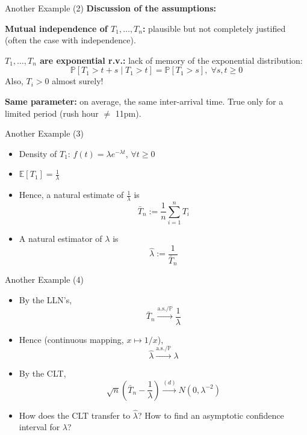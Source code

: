 \documentclass[aspectratio=169]{beamer}
\begin{document}
\begin{frame}{Another Example (2)}
\textbf{Discussion of the assumptions:}

\vspace{0.3cm}

\textbf{Mutual independence of $T_1, \ldots, T_n$:} plausible but not completely justified (often the case with independence).

\vspace{0.3cm}

\textbf{$T_1, \ldots, T_n$ are exponential r.v.:} lack of memory of the exponential distribution:
\[\mathbb{P}[T_1 > t + s \mid T_1 > t] = \mathbb{P}[T_1 > s], \; \forall s,t \geq 0\]
Also, $T_i > 0$ almost surely!

\vspace{0.3cm}

\textbf{Same parameter:} on average, the same inter-arrival time. True only for a limited period (rush hour $\neq$ 11pm).
\end{frame}

\begin{frame}{Another Example (3)}
\begin{itemize}
    \item Density of $T_1$: $f(t) = \lambda e^{-\lambda t}$, $\forall t \geq 0$

    \item $\mathbb{E}[T_1] = \frac{1}{\lambda}$

    \item Hence, a natural estimate of $\frac{1}{\lambda}$ is
    \[\bar{T}_n := \frac{1}{n}\sum_{i=1}^{n}T_i\]

    \item A natural estimator of $\lambda$ is
    \[\hat{\lambda} := \frac{1}{\bar{T}_n}\]
\end{itemize}
\end{frame}

\begin{frame}{Another Example (4)}
\begin{itemize}
    \item By the LLN's,
    \[\bar{T}_n \xrightarrow{\text{a.s.}/\mathbb{P}} \frac{1}{\lambda}\]

    \item Hence (continuous mapping, $x \mapsto 1/x$),
    \[\hat{\lambda} \xrightarrow{\text{a.s.}/\mathbb{P}} \lambda\]

    \item By the CLT,
    \[\sqrt{n}\left(\bar{T}_n - \frac{1}{\lambda}\right) \xrightarrow{(d)} N(0, \lambda^{-2})\]

    \item How does the CLT transfer to $\hat{\lambda}$? How to find an asymptotic confidence interval for $\lambda$?
\end{itemize}
\end{frame}
\end{document}
